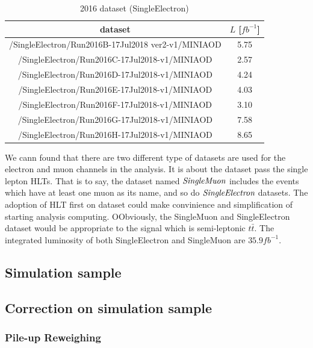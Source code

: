 		\begin{center}
		\setlength{\tabcolsep}{12pt}
		\begin{longtable}{ | c | c | }
		\caption{2016 dataset (SingleElectron)} \\
		\hline
		dataset & $L$ [$fb^{-1}$]\\
		\hline
		/SingleElectron/Run2016B-17Jul2018 ver2-v1/MINIAOD & 5.75 \\
		/SingleElectron/Run2016C-17Jul2018-v1/MINIAOD & 2.57 \\
		/SingleElectron/Run2016D-17Jul2018-v1/MINIAOD & 4.24 \\
		/SingleElectron/Run2016E-17Jul2018-v1/MINIAOD & 4.03 \\
		/SingleElectron/Run2016F-17Jul2018-v1/MINIAOD & 3.10 \\
		/SingleElectron/Run2016G-17Jul2018-v1/MINIAOD & 7.58 \\
		/SingleElectron/Run2016H-17Jul2018-v1/MINIAOD & 8.65 \\
		\hline
		\end{longtable}
		\label{DataAndMC:tb:dataset_el}
		\end{center}

		We cann found that there are two different type of datasets are used for the electron and muon channels in the analysis. It is about the dataset pass the single lepton HLTs. That is to say, the dataset named $\emph{SingleMuon}$ includes the events which have at least one muon as its name, and so do $\emph{SingleElectron}$ datasets. The adoption of HLT first on dataset could make convinience and simplification of starting analysis computing. OObviously, the SingleMuon and SingleElectron dataset would be appropriate to the signal which is semi-leptonic $t\bar{t}$. The integrated luminosity of both SingleElectron and SingleMuon are $35.9 fb^{-1}$.


	\subsection{Simulation sample}
	\label{ssec:DataAndMC_MC}

	\subsection{Correction on simulation sample}
	\label{ssec:DataAndMC_corMC}

		\subsubsection{Pile-up Reweighing}
		\label{sssec:DataAndMC_PU}

